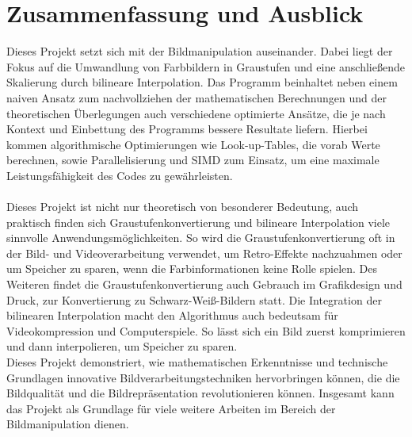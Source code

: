 \documentclass[course=erap]{aspdoc}
\begin{document}
\section{Zusammenfassung und Ausblick}
Dieses Projekt setzt sich mit der Bildmanipulation auseinander. Dabei liegt der Fokus auf die Umwandlung von Farbbildern in Graustufen und eine anschließende Skalierung durch bilineare Interpolation. Das Programm beinhaltet neben einem naiven Ansatz zum nachvollziehen der mathematischen Berechnungen und der theoretischen Überlegungen auch verschiedene optimierte Ansätze, die je nach Kontext und Einbettung des Programms bessere Resultate liefern. Hierbei kommen algorithmische Optimierungen wie Look-up-Tables, die vorab Werte berechnen, sowie Parallelisierung und SIMD zum Einsatz, um eine maximale Leistungsfähigkeit des Codes zu gewährleisten.\\\\
Dieses Projekt ist nicht nur theoretisch von besonderer Bedeutung, auch praktisch finden sich Graustufenkonvertierung und bilineare Interpolation viele sinnvolle Anwendungsmöglichkeiten. So wird die Graustufenkonvertierung oft in der Bild- und Videoverarbeitung verwendet, um Retro-Effekte nachzuahmen oder um Speicher zu sparen, wenn die Farbinformationen keine Rolle spielen. Des Weiteren findet die Graustufenkonvertierung auch Gebrauch im Grafikdesign und Druck, zur Konvertierung zu Schwarz-Weiß-Bildern statt. Die Integration der bilinearen Interpolation macht den Algorithmus auch bedeutsam für Videokompression und Computerspiele. So lässt sich ein Bild zuerst komprimieren und dann interpolieren, um Speicher zu sparen.\\
Dieses Projekt demonstriert, wie mathematischen Erkenntnisse und technische Grundlagen innovative Bildverarbeitungstechniken hervorbringen können, die die Bildqualität und die Bildrepräsentation revolutionieren können. Insgesamt kann das Projekt als Grundlage für viele weitere Arbeiten im Bereich der Bildmanipulation dienen.


{

\cite{ece472}
\cite{ppm}
\cite{ppmformats}
\cite{pgmpgmpbm}
\cite{grafikgraustufen}
\cite{bilint}
\cite{wahrnehmung}

}
\end{document}
